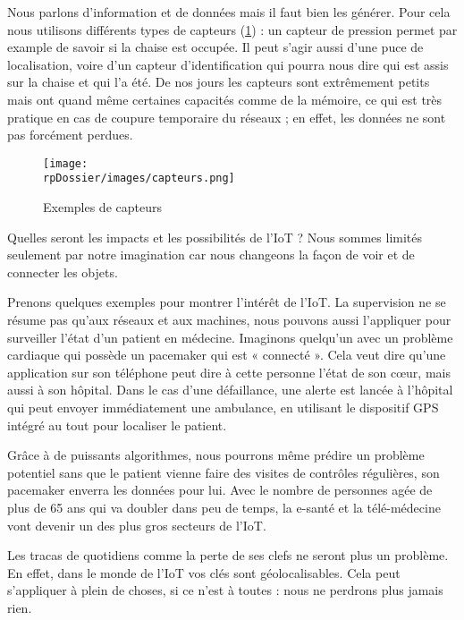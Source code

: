 Nous parlons d'information et de données mais il faut bien les générer. Pour cela nous utilisons différents types de capteurs (\cref{sensors}) : un capteur de pression permet par example de savoir si la chaise est occupée. Il peut s’agir aussi d’une puce de localisation, voire d’un capteur d'identification qui pourra nous dire qui est assis sur la chaise et qui l'a été. De nos jours les capteurs sont extrêmement petits mais ont quand même certaines capacités comme de la mémoire, ce qui est très pratique en cas de coupure temporaire du réseaux ; en effet, les données ne sont pas forcément perdues.

\begin{figure}[H]
\centering
\texttt{[image: \\rpDossier/images/capteurs.png]}
\caption{Exemples de capteurs}
\label{sensors}
\end{figure}

Quelles seront les impacts et les possibilités de l'IoT ? Nous sommes limités seulement par notre imagination car nous changeons la façon de voir et de connecter les objets.


Prenons quelques exemples pour montrer l'intérêt de l'IoT. La supervision ne se résume pas qu’aux réseaux et aux machines, nous pouvons aussi l'appliquer pour surveiller l'état d'un patient en médecine. Imaginons quelqu'un avec un problème cardiaque qui possède un pacemaker qui est « connecté ». Cela veut dire qu'une application sur son téléphone peut dire à cette personne l'état de son cœur, mais aussi à son hôpital. Dans le cas d'une défaillance, une alerte est lancée à l'hôpital qui peut envoyer immédiatement une ambulance, en utilisant le dispositif GPS intégré au tout pour localiser le patient.

Grâce à de puissants algorithmes, nous pourrons même prédire un problème potentiel sans que le patient vienne faire des visites de contrôles régulières, son pacemaker enverra les données pour lui. Avec le nombre de personnes agée de plus de 65 ans qui va doubler dans peu de temps, la e-santé et la télé-médecine vont devenir un des plus gros secteurs de l'IoT. 


Les tracas de quotidiens comme la perte de ses clefs ne seront plus un problème. En effet, dans le monde de l'IoT vos clés sont géolocalisables. Cela peut s'appliquer à plein de choses, si ce n'est à toutes : nous ne perdrons plus jamais rien.


